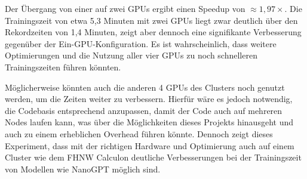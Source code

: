 Der Übergang von einer auf zwei GPUs ergibt einen Speedup von \(\approx 1{,}97\times\). Die Trainingszeit von etwa 5,3 Minuten mit zwei GPUs liegt zwar deutlich über den Rekordzeiten von 1,4 Minuten, zeigt aber dennoch eine signifikante Verbesserung gegenüber der Ein-GPU-Konfiguration. Es ist wahrscheinlich, dass weitere Optimierungen und die Nutzung aller vier GPUs zu noch schnelleren Trainingszeiten führen könnten.

Möglicherweise könnten auch die anderen 4 GPUs des Clusters noch genutzt werden, um die Zeiten weiter zu verbessern. Hierfür wäre es jedoch notwendig, die Codebasis entsprechend anzupassen, damit der Code auch auf mehreren Nodes laufen kann, was über die Möglichkeiten dieses Projekts hinausgeht und auch zu einem erheblichen Overhead führen könnte. Dennoch zeigt dieses Experiment, dass mit der richtigen Hardware und Optimierung auch auf einem Cluster wie dem FHNW Calculon deutliche Verbesserungen bei der Trainingszeit von Modellen wie NanoGPT möglich sind.
